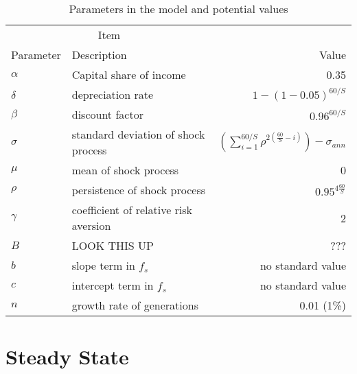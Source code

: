 \documentclass[paper=a4, fontsize=11pt]{scrartcl} %
\numberwithin{figure}{section} %
\numberwithin{table}{section} %
\begin{document}
\begin{table}[htbp]
   \centering
   \begin{tabular}{@{} llr @{}} %
      \toprule
      \multicolumn{2}{c}{Item} \\
      \cmidrule(r){1-2} %
      Parameter    & Description & Value\\
      \midrule
			$\alpha$    & Capital share of income & 0.35 \\
			$\delta$     & depreciation rate     &  $1 - (1 - 0.05)^{60/S}$ \\
			$\beta$      & discount factor  & $0.96^{60/S}$ \\
			$\sigma$    & standard deviation of shock process  & $(\sum_{i=1}^{60/S} \rho^{2(\frac{60}{S} - i)}) - \sigma_{ann}$ \\
			$\mu$   	 & mean of shock process  & 0 \\
			$\rho$        & persistence of shock process& $0.95^{4 \frac{60}{S}}$ \\
			$\gamma$  & coefficient of relative risk aversion  & 2 \\
			$B$            & LOOK THIS UP  & ??? \\
			$b$       	 & slope term in $f_s$  & no standard value \\
			$c$      	 & intercept term in $f_s$  & no standard value \\
			$n$ 		 & growth rate of generations  & 0.01 (1\%) \\
      \bottomrule
   \end{tabular}
   \caption{Parameters in the model and potential values}
   \label{tab:booktabs}
\end{table}



\section{Steady State}
\end{document}
